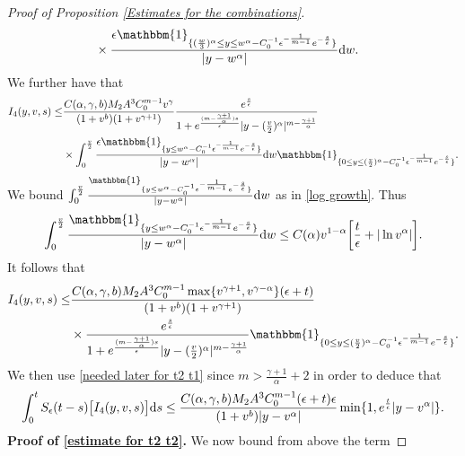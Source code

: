 \documentclass[11pt]{article}
\numberwithin{equation}{section}
\newcommand{\der}{\textup{d}}
\begin{document}
\begin{proof}[Proof of Proposition \ref{Estimates for the combinations}]
\begin{align*}
      &\times \frac{\epsilon\mathbbm{1}_{\{(\frac{w}{3})^{\alpha}\leq y\leq w^{\alpha}-C_{0}^{-1}\epsilon^{-\frac{1}{m-1}}e^{-\frac{s}{\epsilon}}\}}}{|y-w^{\alpha}|}\der w.
  \end{align*}
  We further have that
     \begin{align*}
     I_{4}(y,v,s)
      \leq & \frac{C(\alpha,\gamma,b)M_{2}A^{3}C_{0}^{m-1} v^{\gamma}}{(1+v^{b})(1+v^{\gamma+1})}\frac{e^{\frac{s}{\epsilon}}}{1+e^{\frac{(m-\frac{\gamma+1}{\alpha})s}{\epsilon}}|y-(\frac{v}{2})^{\alpha}|^{m-\frac{\gamma+1}{\alpha}}}\\
      &\times \int_{0}^{\frac{v}{2}}\frac{\epsilon\mathbbm{1}_{\{ y\leq w^{\alpha}-C_{0}^{-1}\epsilon^{-\frac{1}{m-1}}e^{-\frac{s}{\epsilon}}\}}}{|y-w^{\alpha}|}\der w\mathbbm{1}_{\{0\leq y\leq (\frac{v}{2})^{\alpha}-C_{0}^{-1}\epsilon^{-\frac{1}{m-1}}e^{-\frac{s}{\epsilon}}\}}.
\end{align*}
We bound $\int_{0}^{\frac{v}{2}}\frac{\mathbbm{1}_{\{ y\leq w^{\alpha}-C_{0}^{-1}\epsilon^{-\frac{1}{m-1}}e^{-\frac{s}{\epsilon}}\}}}{|y-w^{\alpha}|}\der w$ as in  \eqref{log growth}. Thus \begin{align}
\int_{0}^{\frac{v}{2}}\frac{\mathbbm{1}_{\{y\leq w^{\alpha}-C_{0}^{-1}\epsilon^{-\frac{1}{m-1}}e^{-\frac{s}{\epsilon}}\}}}{|y-w^{\alpha}|}\der w\leq C(\alpha)v^{1-\alpha}\bigg[\frac{t}{\epsilon}+|\ln{v^{\alpha}}|\bigg].
\end{align}
It follows that 
  \begin{align*}
     I_{4}(y,v,s)
      \leq & \frac{C(\alpha,\gamma,b)M_{2}A^{3}C_{0}^{m-1}\max\{v^{\gamma+1},v^{\gamma-\alpha}\}(\epsilon+t)}{(1+v^{b})(1+v^{\gamma+1})}\\
      &\times\frac{e^{\frac{s}{\epsilon}}}{1+e^{\frac{(m-\frac{\gamma+1}{\alpha})s}{\epsilon}}|y-(\frac{v}{2})^{\alpha}|^{m-\frac{\gamma+1}{\alpha}}}\mathbbm{1}_{\{0\leq y\leq (\frac{v}{2})^{\alpha}-C_{0}^{-1}\epsilon^{-\frac{1}{m-1}}e^{-\frac{s}{\epsilon}}\}}.
\end{align*}
We then use \eqref{needed later for t2 t1} since $m>\frac{\gamma+1}{\alpha}+2$ in order to deduce that
\begin{align*}
    \int_{0}^{t}S_{\epsilon}(t-s)\big[I_{4}(y,v,s)\big]\der s \leq  \frac{ C(\alpha,\gamma,b)M_{2}A^{3}C_{0}^{m-1}(\epsilon+t) \epsilon}{(1+v^{b})|y-v^{\alpha}|}\min\{1,e^{\frac{t}{\epsilon}}|y-v^{\alpha}|\}.
\end{align*}
\textbf{Proof of \eqref{estimate for t2 t2}.} We now bound from above the term 


\end{proof}
\end{document}
